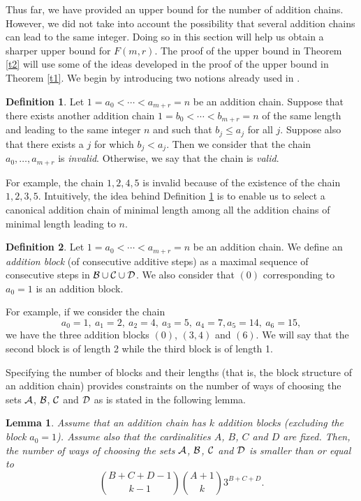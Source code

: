 \documentclass{article}
\newtheorem{lemma}[theorem]{Lemma}
\theoremstyle{definition}
\newtheorem{definition}{Definition}[section]
\begin{document}
Thus far, we have provided an upper bound for the number of addition chains. However, we did not take into account the possibility that several addition chains can lead to the same integer.  Doing so in this section will help us obtain a sharper upper bound for $F(m,r)$.
The proof of the upper bound in Theorem \ref{t2} will use some of the ideas developed in the proof of the upper bound in Theorem \ref{t1}. We begin by introducing two notions already used in \cite{DKN}.

\begin{definition}\label{d1}  Let $1=a_0<\cdots<a_{m+r}=n$ be an addition chain. Suppose that there exists another addition chain $1=b_0<\cdots<b_{m+r}=n$  of the same length and leading to the same integer $n$ and such that $b_j\le a_j$ for all $j$. Suppose also that there exists a $j$ for which $b_j<a_j$. Then we consider that the chain $a_0,\ldots,a_{m+r}$ is {\it invalid}. Otherwise, we say that the chain is {\it valid}.
\end{definition}

For example, the chain $1,2,4,5$ is invalid because of the existence of the chain $1,2,3,5$.
Intuitively, the idea behind Definition \ref{d1} is to enable us to select a canonical addition chain of minimal length among all the  addition chains of minimal length leading to $n$.

\begin{definition} Let $1=a_0<\cdots <a_{m+r}=n$ be an addition chain.  We define an {\it addition block} (of consecutive additive steps) as a maximal sequence of consecutive steps in ${\cal B}\cup {\cal C}\cup {\cal D}$. We also consider that $(0)$ corresponding to $a_0=1$ is an addition block.
\end{definition}

For example, if we consider the chain
$$
a_0=1,\ a_1=2,\ a_2=4,\ a_3=5,\ a_4=7, a_5=14, \ a_6=15,
$$
we have the three addition blocks $(0)$, $(3,4)$ and $(6)$.  We will say that the second block is of length 2 while the third block is of length 1.

Specifying the number of blocks and their lengths (that is, the block structure of an addition chain) provides constraints on the number of ways of choosing the sets ${\cal A}$, ${\cal B}$, ${\cal C}$ and ${\cal D}$ as is stated in the following lemma.

\begin{lemma}\label{t21}
Assume that an addition chain has $k$ addition blocks (excluding the block $a_0=1$). Assume also that the cardinalities $A$, $B$, $C$ and $D$ are fixed. Then,  the number of ways of choosing the sets ${\cal A}$, ${\cal B}$, ${\cal C}$ and ${\cal D}$ is smaller than or equal to
$$
{B+C+D-1\choose k-1}{A+1\choose k}3^{B+C+D}.
$$
\end{lemma}
\end{document}
